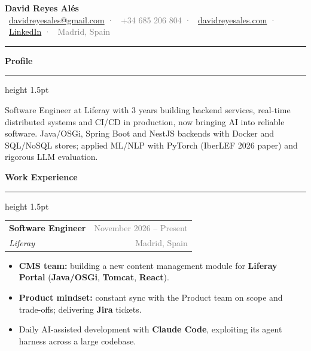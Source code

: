 \documentclass[9.5pt, a4paper]{article}
\newcommand{\cvsection}[1]{%
    \vspace{0.2cm}
    {\large \textbf{\textcolor{primary}{#1}}}
    \vspace{0.05cm}
    \textcolor{accent}{\hrule height 1.5pt}
    \vspace{0.1cm}
}
\newcommand{\cventry}[4]{%
    \noindent
    \begin{tabularx}{\textwidth}{Xr}
        \textbf{\textcolor{primary}{#1}} & \textcolor{gray}{\small #2} \\
        \textit{\textcolor{accent}{#3}} & \textcolor{gray}{\small #4}
    \end{tabularx}
    \vspace{0.1cm}
}
\begin{document}
\begin{center}
    {\LARGE \textbf{\textcolor{primary}{David Reyes Alés}}}
    \quad{\large \textcolor{accent}{Software Engineer · Backend \& Infrastructure · Applied AI}}\\[5pt]
    \textcolor{gray}{\small
        \faEnvelope\ \href{mailto:davidreyesales@gmail.com}{davidreyesales@gmail.com}
        \textcolor{accent}{·}
        \faPhone\ +34 685 206 804
        \textcolor{accent}{·}
        \faGlobe\ \href{https://www.davidreyesales.com}{davidreyesales.com}
        \textcolor{accent}{·}
        \faLinkedin\ \href{https://www.linkedin.com/in/david-reyes-ales/}{LinkedIn}
        \textcolor{accent}{·}
        \faMapMarker*\ Madrid, Spain
    }
\end{center}

\vspace{0.1cm}
\noindent\textcolor{accent}{\rule{\linewidth}{2pt}}
\vspace{0.05cm}

\cvsection{Profile}

\noindent
Software Engineer at Liferay with 3 years building backend services, real-time distributed systems and CI/CD in production, now bringing AI into reliable software. Java/OSGi, Spring Boot and NestJS backends with Docker and SQL/NoSQL stores; applied ML/NLP with PyTorch (IberLEF 2026 paper) and rigorous LLM evaluation.

\cvsection{Work Experience}

\cventry{Software Engineer}{November 2026 -- Present}{Liferay}{Madrid, Spain}

\begin{itemize}[leftmargin=1.2em, itemsep=1pt, topsep=0pt]
    \item \textbf{CMS team:} building a new content management module for \textbf{Liferay Portal} (\textbf{Java/OSGi}, \textbf{Tomcat}, \textbf{React}).
    \item \textbf{Product mindset:} constant sync with the Product team on scope and trade-offs; delivering \textbf{Jira} tickets.
    \item Daily AI-assisted development with \textbf{Claude Code}, exploiting its agent harness across a large codebase.
\end{itemize}
\end{document}

